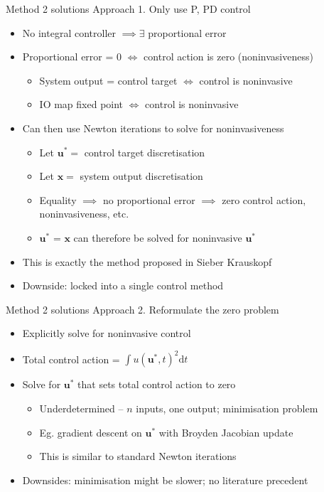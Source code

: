 \documentclass[presentation]{beamer}
\begin{document}
\begin{frame}[<+->][label={sec:org217e6fe}]{Method 2 solutions}
Approach 1. Only use P, PD control
\begin{itemize}
\item No integral controller \(\implies\exists\) proportional error
\item Proportional error = 0 \(\iff\) control action is zero (noninvasiveness)
\begin{itemize}
\item System output = control target \(\iff\) control is noninvasive
\item IO map fixed point \(\iff\) control is noninvasive
\end{itemize}
\item Can then use Newton iterations to solve for noninvasiveness
\begin{itemize}
\item Let \(\mathbf{u}^*=\) control target discretisation
\item Let \(\mathbf{x}=\) system output discretisation
\item Equality \(\implies\) no proportional error \(\implies\) zero control action, noninvasiveness, etc.
\item \(\mathbf{u}^*\) = \(\mathbf{x}\) can therefore be solved for noninvasive \(\mathbf{u}^*\)
\end{itemize}
\item This is exactly the method proposed in Sieber Krauskopf
\item Downside: locked into a single control method
\end{itemize}
\end{frame}

\begin{frame}[<+->][label={sec:orgc7878d1}]{Method 2 solutions}
Approach 2. Reformulate the zero problem
\vfill
\begin{itemize}
\item Explicitly solve for noninvasive control
\item Total control action = \(\int u(\mathbf{u^*}, t)^2\mathrm{d}t\)
\item Solve for \(\mathbf{u}^*\) that sets total control action to zero
\begin{itemize}
\item Underdetermined -- \(n\) inputs, one output; minimisation problem
\item Eg. gradient descent on \(\mathbf{u}^*\) with Broyden Jacobian update
\item This is similar to standard Newton iterations
\end{itemize}
\item Downsides: minimisation might be slower; no literature precedent
\end{itemize}
\end{frame}
\end{document}
